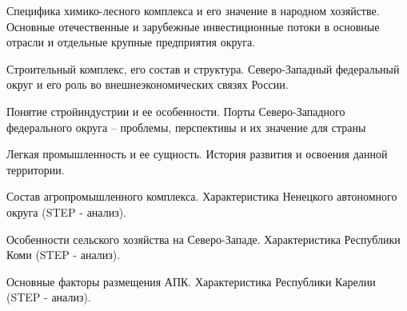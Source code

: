 \documentclass[
	14pt,
	a4paper,
	]
	{scrartcl}
\begin{document}
\vfill

\newpage


\shapk
{}
\setcounter{zad}{0}

\vfill
\z Специфика химико-лесного комплекса и его значение в народном хозяйстве.
 \vfill
\z Основные отечественные и зарубежные инвестиционные потоки в основные отрасли и отдельные крупные предприятия округа.
 \vfill

\vfill

\newpage


\shapk
{}
\setcounter{zad}{0}

\vfill
\z Строительный комплекс, его состав и структура.
 \vfill
\z Северо-Западный федеральный округ и его роль во внешнеэкономических связях России.
 \vfill

\vfill

\newpage


\shapk
{}
\setcounter{zad}{0}

\vfill
\z Понятие стройиндустрии и ее особенности.
 \vfill
\z Порты Северо-Западного федерального округа – проблемы, перспективы и их значение для страны
 \vfill

\vfill

\newpage


\shapk
{}
\setcounter{zad}{0}

\vfill
\z Легкая промышленность и ее сущность.
 \vfill
\z История развития и освоения данной территории.
 \vfill

\vfill

\newpage


\shapk
{}
\setcounter{zad}{0}

\vfill
\z Состав агропромышленного комплекса.
 \vfill
\z Характеристика Ненецкого автономного округа (STEP - анализ).
 \vfill

\vfill

\newpage


\shapk
{}
\setcounter{zad}{0}

\vfill
\z Особенности сельского хозяйства на Северо-Западе.
 \vfill
\z Характеристика Республики Коми (STEP - анализ).
 \vfill

\vfill

\newpage


\shapk
{}
\setcounter{zad}{0}

\vfill
\z Основные факторы размещения АПК.
 \vfill
\z Характеристика Республики Карелии (STEP - анализ).
 \vfill
\end{document}
